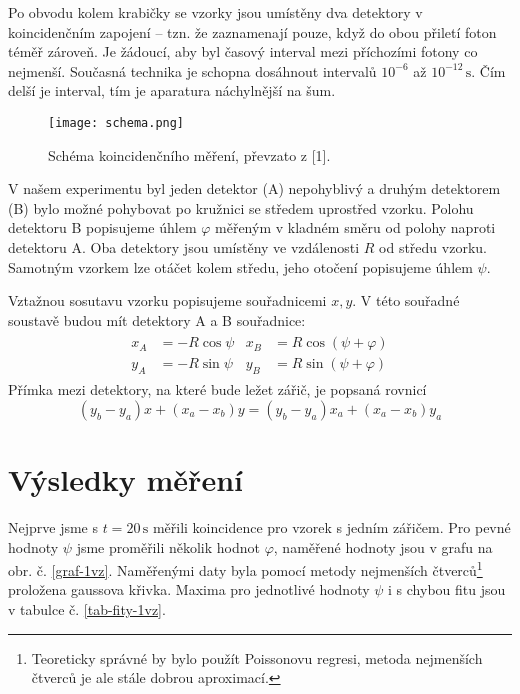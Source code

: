 \documentclass[10pt,a4paper]{article}
\renewcommand{\U}[1]{\ensuremath{\,\mathrm{#1}}}
\newcommand{\°}{\degree}
\begin{document}
Po obvodu kolem krabičky se vzorky jsou umístěny dva detektory v koincidenčním zapojení – tzn. že zaznamenají pouze, když do obou přiletí foton téměř zároveň. Je žádoucí, aby byl časový interval mezi příchozími fotony co nejmenší. Současná technika je schopna dosáhnout intervalů $10^{-6}$ až $10^{-12} \U{s}$. \cite{studijni-text} Čím delší je interval, tím je aparatura náchylnější na šum.

\begin{figure}[h]
    \centering
    \texttt{[image: schema.png]}
    \caption{Schéma koincidenčního měření, převzato z [1].}
\end{figure}

V našem experimentu byl jeden detektor (A) nepohyblivý a druhým detektorem (B) bylo možné pohybovat po kružnici se středem uprostřed vzorku. Polohu detektoru B popisujeme úhlem $\varphi$ měřeným v kladném směru od polohy naproti detektoru A. Oba detektory jsou umístěny ve vzdálenosti $R$ od středu vzorku. Samotným vzorkem lze otáčet kolem středu, jeho otočení popisujeme úhlem $\psi$.

Vztažnou sosutavu vzorku popisujeme souřadnicemi $x, y$. V této souřadné soustavě budou mít detektory A a B souřadnice:
\begin{gather}
    \begin{aligned}
        x_A &= -R \cos \psi & x_B &= R \cos(\psi + \varphi)\\
        y_A &= -R \sin \psi & y_B &= R \sin(\psi + \varphi)
    \end{aligned}
    \label{detektory-xy}
\end{gather}
Přímka mezi detektory, na které bude ležet zářič, je popsaná rovnicí
\begin{equation}
    (y_b - y_a)x + (x_a - x_b)y = (y_b - y_a)x_a + (x_a - x_b)y_a
    \label{primka-xy}
\end{equation}


\section{Výsledky měření}
Nejprve jsme s $t=20\U{s}$ měřili koincidence pro vzorek s jedním zářičem. Pro pevné hodnoty $\psi$ jsme proměřili několik hodnot $\varphi$, naměřené hodnoty jsou v grafu na obr. č. \ref{graf-1vz}. Naměřenými daty byla pomocí metody nejmenších čtverců\footnote{Teoreticky správné by bylo použít Poissonovu regresi, metoda nejmenších čtverců je ale stále dobrou aproximací.} proložena gaussova křivka. Maxima pro jednotlivé hodnoty $\psi$ i s chybou fitu jsou v tabulce č. \ref{tab-fity-1vz}.
\end{document}
